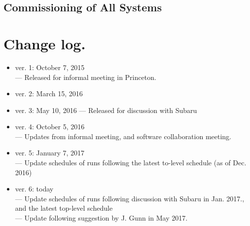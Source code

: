 \documentclass[11pt]{article}
\begin{document}
\renewcommand{\thesubsubsection}{A-\;\arabic{subsubsection}}
\subsection{Commissioning of All Systems}\label{sec:All}


%





\clearpage



\clearpage



\clearpage

\appendix



\section*{Change log.}
\begin{itemize}
\item ver. 1: October 7, 2015 \\
--- Released for informal meeting in Princeton.
\item ver. 2:  March 15, 2016
\item ver. 3: May 10, 2016
--- Released for discussion with Subaru
\item ver. 4: October 5, 2016 \\
--- Updates from informal meeting, and software collaboration meeting.
\item ver. 5: January 7, 2017 \\
--- Update schedules of runs following the latest to-level schedule (as of Dec. 2016)
\item ver. 6: today \\
--- Update schedules of runs following discussion with Subaru in Jan. 2017., and the latest top-level schedule \\
--- Update following suggestion by J. Gunn in May 2017.
\end{itemize}
\end{document}
